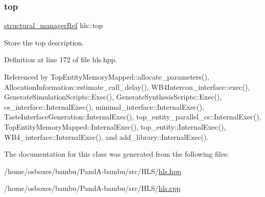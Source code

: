 \mbox{\label{classhls_af714c4c35f2a225f8b5a7b02a67f278f}} 
\subsubsection{\texorpdfstring{top}{top}}
{\footnotesize\ttfamily \hyperlink{structural__manager_8hpp_ab3136f0e785d8535f8d252a7b53db5b5}{structural\+\_\+manager\+Ref} hls\+::top}



Store the top description. 



Definition at line 172 of file hls.\+hpp.



Referenced by Top\+Entity\+Memory\+Mapped\+::allocate\+\_\+parameters(), Allocation\+Information\+::estimate\+\_\+call\+\_\+delay(), W\+B4\+Intercon\+\_\+interface\+::exec(), Generate\+Simulation\+Scripts\+::\+Exec(), Generate\+Synthesis\+Scripts\+::\+Exec(), cs\+\_\+interface\+::\+Internal\+Exec(), minimal\+\_\+interface\+::\+Internal\+Exec(), Taste\+Interface\+Generation\+::\+Internal\+Exec(), top\+\_\+entity\+\_\+parallel\+\_\+cs\+::\+Internal\+Exec(), Top\+Entity\+Memory\+Mapped\+::\+Internal\+Exec(), top\+\_\+entity\+::\+Internal\+Exec(), W\+B4\+\_\+interface\+::\+Internal\+Exec(), and add\+\_\+library\+::\+Internal\+Exec().



The documentation for this class was generated from the following files\+:\begin{DoxyCompactItemize}
\item 
/home/osboxes/bambu/\+Pand\+A-\/bambu/src/\+H\+L\+S/\hyperlink{hls_8hpp}{hls.\+hpp}\item 
/home/osboxes/bambu/\+Pand\+A-\/bambu/src/\+H\+L\+S/\hyperlink{hls_8cpp}{hls.\+cpp}\end{DoxyCompactItemize}
